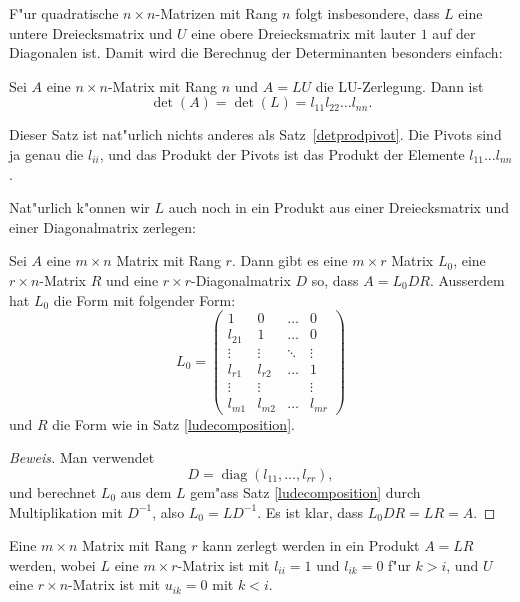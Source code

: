 F"ur quadratische $n\times n$-Matrizen mit Rang $n$ folgt insbesondere,
dass $L$ eine untere Dreiecksmatrix und $U$ eine obere Dreiecksmatrix
mit lauter $1$ auf der Diagonalen ist. Damit wird die Berechnug der
Determinanten besonders einfach:

\begin{satz}
Sei $A$ eine $n\times n$-Matrix mit Rang $n$ und $A=LU$ die LU-Zerlegung.
Dann ist
\[
\det(A)=\det(L)=l_{11}l_{22}\dots l_{nn}.
\]
\end{satz}

Dieser Satz ist nat"urlich nichts anderes als Satz~\ref{detprodpivot}.
Die Pivots sind ja genau die $l_{ii}$, und 
das Produkt der Pivots ist das Produkt der Elemente
$l_{11}\dots l_{nn}$.

Nat"urlich k"onnen wir $L$ auch noch in ein Produkt aus einer
Dreiecksmatrix und einer Diagonalmatrix zerlegen:

\begin{satz}
\label{ldrdecomposition}
Sei $A$ eine $m\times n$ Matrix mit Rang $r$. Dann gibt es eine $m\times r$
Matrix $L_0$, eine $r\times n$-Matrix $R$ und eine $r\times r$-Diagonalmatrix $D$
so, dass $A=L_0DR$. Ausserdem hat $L_0$ die Form
mit folgender Form:
\[
L_0=\begin{pmatrix}
1     &0&\dots&0\\
l_{21}&1     &\dots&0\\
\vdots&\vdots&\ddots&\vdots\\
l_{r1}&l_{r2}&\dots&1     \\
\vdots&\vdots& &\vdots\\
l_{m1}&l_{m2}&\dots&l_{mr}
\end{pmatrix}
\]
und $R$ die Form wie in Satz \ref{ludecomposition}.
\end{satz}

\begin{proof}[Beweis]
Man verwendet 
\[
D=\operatorname{diag}(l_{11},\dots,l_{rr}),
\]
und berechnet $L_0$ aus dem $L$ gem"ass Satz \ref{ludecomposition} durch
Multiplikation mit $D^{-1}$, also $L_0=LD^{-1}$. Es ist klar, dass
$L_0DR=LR=A$.
\end{proof}

\begin{satz}[LR-Zerlegung]
Eine $m\times n$ Matrix mit Rang $r$ kann zerlegt werden in ein Produkt $A=LR$
werden, wobei $L$ eine $m\times r$-Matrix ist mit $l_{ii}=1$ und $l_{ik}=0$
f"ur $k>i$, und $U$ eine $r\times n$-Matrix ist mit $u_{ik}=0$ mit $k<i$.
\end{satz}

